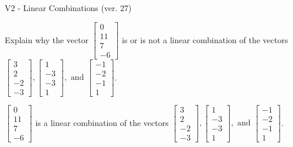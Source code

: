 \begin{exercise}
  \begin{exerciseTitle}V2 - Linear Combinations (ver. 27)\end{exerciseTitle}
  \begin{exerciseStatement}
    Explain why the vector \(\left[\begin{array}{c}
0 \\
11 \\
7 \\
-6
\end{array}\right]\)  is or is not a linear 
	combination of the vectors \(\left[\begin{array}{c}
3 \\
2 \\
-2 \\
-3
\end{array}\right] , \left[\begin{array}{c}
1 \\
-3 \\
-3 \\
1
\end{array}\right] , \text{ and } \left[\begin{array}{c}
-1 \\
-2 \\
-1 \\
1
\end{array}\right]\).
	


  \end{exerciseStatement}
  \begin{exerciseAnswer}
   \(\left[\begin{array}{c}
0 \\
11 \\
7 \\
-6
\end{array}\right]\) 
  	 is  
	a linear combination of the vectors \(\left[\begin{array}{c}
3 \\
2 \\
-2 \\
-3
\end{array}\right] , \left[\begin{array}{c}
1 \\
-3 \\
-3 \\
1
\end{array}\right] , \text{ and } \left[\begin{array}{c}
-1 \\
-2 \\
-1 \\
1
\end{array}\right]\).

	
  


  \end{exerciseAnswer}
\end{exercise}